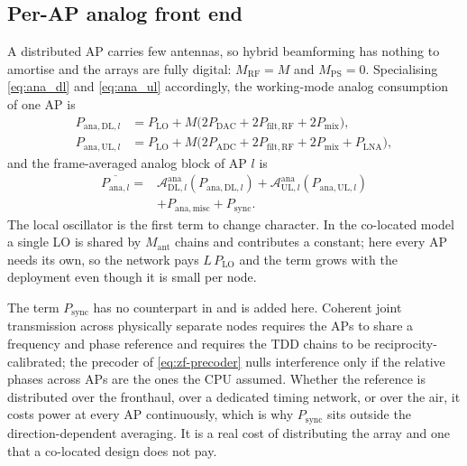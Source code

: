 \subsection{Per-AP analog front end}
\label{ssec:dmimo_ana}

A distributed AP carries few antennas, so hybrid beamforming has nothing to
amortise and the arrays are fully digital: $M_{\mathrm{RF}}=M$ and
$M_{\mathrm{PS}}=0$. Specialising \eqref{eq:ana_dl} and \eqref{eq:ana_ul}
accordingly, the working-mode analog consumption of one AP is
\begin{align}
\label{eq:ana_dl_ap}
P_{\mathrm{ana,DL},l} &= P_{\mathrm{LO}} + M\big(
2P_{\mathrm{DAC}} + 2P_{\mathrm{filt,RF}} + 2P_{\mathrm{mix}}\big),\\
\label{eq:ana_ul_ap}
P_{\mathrm{ana,UL},l} &= P_{\mathrm{LO}} + M\big(
2P_{\mathrm{ADC}} + 2P_{\mathrm{filt,RF}} + 2P_{\mathrm{mix}}
+ P_{\mathrm{LNA}}\big),
\end{align}
and the frame-averaged analog block of AP $l$ is
\begin{align}
\label{eq:ana_avg_ap}
\overline{P_{\mathrm{ana},l}} ={}&
\mathcal{A}_{\mathrm{DL},l}^{\mathrm{ana}}\!\left(P_{\mathrm{ana,DL},l}\right)
+ \mathcal{A}_{\mathrm{UL},l}^{\mathrm{ana}}\!\left(P_{\mathrm{ana,UL},l}\right)
\nonumber\\
&+ P_{\mathrm{ana,misc}} + P_{\mathrm{sync}} .
\end{align}
The local oscillator is the first term to change character. In the co-located
model a single LO is shared by $M_{\mathrm{ant}}$ chains and contributes a
constant; here every AP needs its own, so the network pays $L\,P_{\mathrm{LO}}$
and the term grows with the deployment even though it is small per node.

The term $P_{\mathrm{sync}}$ has no counterpart in  and is added
here. Coherent joint transmission across physically separate nodes requires the
APs to share a frequency and phase reference and requires the TDD chains to be
reciprocity-calibrated; the precoder of \eqref{eq:zf-precoder} nulls
interference only if the relative phases across APs are the ones the CPU assumed.
Whether the reference is distributed over the fronthaul, over a dedicated timing
network, or over the air, it costs power at every AP continuously, which is why
$P_{\mathrm{sync}}$ sits outside the direction-dependent averaging. It is a real
cost of distributing the array and one that a co-located design does not pay.

